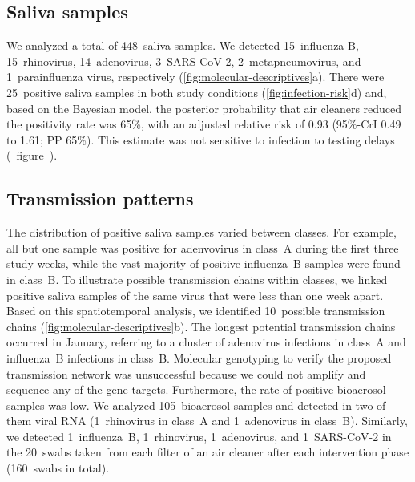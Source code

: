 \documentclass[fleqn,11pt]{wlscirep}
\begin{document}
\subsection*{Saliva samples}

We analyzed a total of 448~saliva samples. We detected 15~influenza B, 15~rhinovirus, 14~adenovirus, 3~SARS-CoV-2, 2~metapneumovirus, and 1~parainfluenza virus, respectively (\cref{fig:molecular-descriptives}a). There were 25~positive saliva samples in both study conditions (\cref{fig:infection-risk}d) and, based on the Bayesian model, the posterior probability that air cleaners reduced the positivity rate was 65\%, with an adjusted relative risk of 0.93 (95\%-CrI 0.49 to 1.61; PP 65\%). This estimate was not sensitive to infection to testing delays (\supp~figure~). 

\subsection*{Transmission patterns}

The distribution of positive saliva samples varied between classes. For example, all but one sample was positive for adenvovirus in class~A during the first three study weeks, while the vast majority of positive influenza~B samples were found in class~B. To illustrate possible transmission chains within classes, we linked positive saliva samples of the same virus that were less than one week apart. Based on this spatiotemporal analysis, we identified 10~possible transmission chains (\cref{fig:molecular-descriptives}b). The longest potential transmission chains occurred in January, referring to a cluster of adenovirus infections in class~A and influenza~B infections in class~B. Molecular genotyping to verify the proposed transmission network was unsuccessful because we could not amplify and sequence any of the gene targets. Furthermore, the rate of positive bioaerosol samples was low. We analyzed 105~bioaerosol samples and detected in two of them viral RNA (1~rhinovirus in class~A and 1~adenovirus in class~B). Similarly, we detected 1~influenza~B, 1~rhinovirus, 1~adenovirus, and 1~SARS-CoV-2 in the 20~swabs taken from each filter of an air cleaner after each intervention phase (160~swabs in total). 

\end{document}

